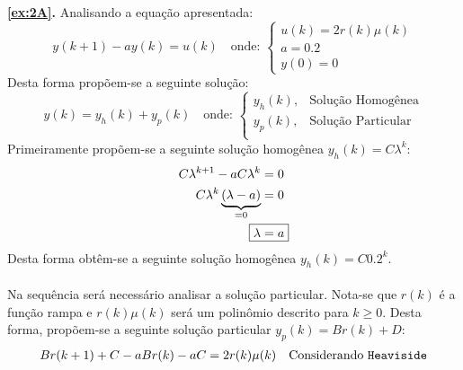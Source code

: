 \documentclass{article}
\begin{document}
            \begin{resolution}
                \textbf{\ref{ex:2A}.} Analisando a equação apresentada:
                    \begin{equation*}
                        y(k+1) -ay(k) = u(k)
                        \quad
                        \text{onde: }
                        \begin{cases}
                            u(k) = 2r(k) \mu(k)\\
                            a    = 0.2\\
                            y(0) = 0
                        \end{cases}
                    \end{equation*}
                Desta forma propõem-se a seguinte solução:
                    \begin{equation*}
                        y(k) = y_{h}(k) + y_{p}(k)
                        \quad
                        \text{onde: }
                        \begin{cases}
                            y_{h}(k), & \text{Solução Homogênea}\\
                            y_{p}(k), & \text{Solução Particular}\\
                        \end{cases}
                    \end{equation*}
                Primeiramente propõem-se a seguinte solução homogênea $y_{h}(k) = C\lambda^{k}$:
                    \begin{align}
                        C\lambda^{k + 1} - aC\lambda^{k} &= 0 \nonumber\\
                        C\lambda^{k} \underbrace{(\lambda - a)}_{=0} &= 0 \nonumber\\
                        \Aboxed{\lambda &= a}
                    \end{align}
                Desta forma obtêm-se a seguinte solução homogênea $y_{h}(k) = C0.2^{k}$.
                \\\\
                Na sequência será necessário analisar a solução particular. Nota-se que $r(k)$ é a função rampa e $r(k)\mu(k)$ será um polinômio descrito para $k\ge0$. Desta forma, propõem-se a seguinte solução particular $y_{p}(k) = Br(k) + D$:
                    \begin{align}
                        Br(k+1) + C - aBr(k) - aC &= 2r(k)\mu(k) & \text{Considerando \texttt{Heaviside}}\nonumber\\

\end{align}
\end{resolution}
\end{document}
